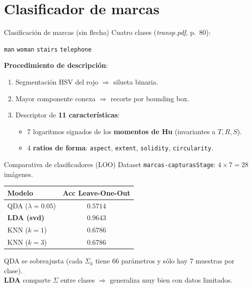 \section{Clasificador de marcas}

\begin{frame}{Clasificación de marcas (sin flecha)}
Cuatro clases (\emph{transp.pdf}, p.~80):
\centerline{\texttt{man} \quad \texttt{woman} \quad \texttt{stairs} \quad \texttt{telephone}}

\medskip
\textbf{Procedimiento de descripción}:
\begin{enumerate}
  \item Segmentación HSV del rojo $\Rightarrow$ silueta binaria.
  \item Mayor componente conexa $\Rightarrow$ recorte por bounding box.
  \item Descriptor de \textbf{11 características}:
  \begin{itemize}
    \item $7$ logaritmos signados de los \textbf{momentos de Hu} (invariantes a $T,R,S$).
    \item $4$ \textbf{ratios de forma}: \texttt{aspect}, \texttt{extent}, \texttt{solidity}, \texttt{circularity}.
  \end{itemize}
\end{enumerate}
\end{frame}

\begin{frame}{Comparativa de clasificadores (LOO)}
Dataset \texttt{marcas-capturasStage}: $4 \times 7 = 28$ imágenes.
\medskip

\begin{center}
\begin{tabular}{lc}
\hline
\textbf{Modelo}     & \textbf{Acc Leave-One-Out}\\\hline
QDA ($\lambda=0.05$) & $0.5714$\\
\textbf{LDA (svd)}   & $\mathbf{0.9643}$\\
KNN ($k=1$)          & $0.6786$\\
KNN ($k=3$)          & $0.6786$\\\hline
\end{tabular}
\end{center}

\medskip
QDA se sobreajusta (cada $\Sigma_k$ tiene 66 parámetros y sólo hay 7 muestras por clase).\\
\textbf{LDA} comparte $\Sigma$ entre clases $\Rightarrow$ generaliza muy bien con datos limitados.
\end{frame}


